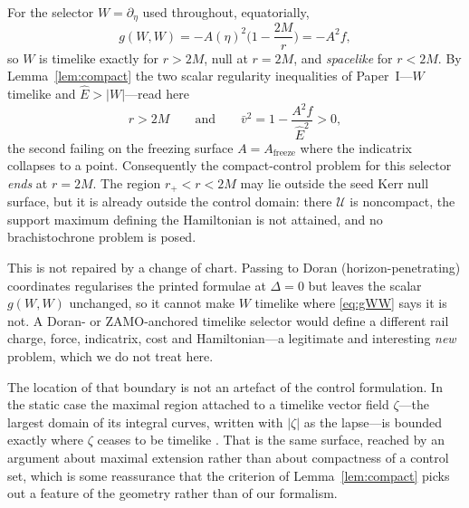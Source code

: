 \documentclass[12pt]{iopart}
\theoremstyle{plain}
\theoremstyle{definition}
\theoremstyle{remark}
\newcommand{\Ehat}{\hat E}
\newcommand{\rp}{r_{+}}
\newcommand{\Af}{A_{\mathrm{freeze}}}
\begin{document}
For the selector $W=\partial_\eta$ used throughout, equatorially,
\begin{equation}
    g(W,W)=-A(\eta)^2\Big(1-\frac{2M}{r}\Big)=-A^2f ,
    \label{eq:gWW}
\end{equation}
so $W$ is timelike exactly for $r>2M$, null at $r=2M$, and \emph{spacelike} for
$r<2M$. By Lemma~\ref{lem:compact} the two scalar regularity inequalities of
Paper~I---$W$ timelike and $\Ehat>|W|$---read here
\begin{equation}
    r>2M
    \qquad\text{and}\qquad
    \bar v^2=1-\frac{A^2f}{\Ehat^2}>0 ,
    \label{eq:two-inequalities}
\end{equation}
the second failing on the freezing surface $A=\Af$ where the indicatrix collapses
to a point. Consequently the compact-control problem for this selector
\emph{ends} at $r=2M$. The region $\rp<r<2M$ may lie outside the seed Kerr null
surface, but it is already outside the control domain: there $\mathcal U$ is
noncompact, the support maximum defining the Hamiltonian is not attained, and no
brachistochrone problem is posed.

This is not repaired by a change of chart. Passing to Doran
(horizon-penetrating) coordinates regularises the printed formulae at $\Delta=0$
but leaves the scalar $g(W,W)$ unchanged, so it cannot make $W$ timelike where
\eqref{eq:gWW} says it is not. A Doran- or ZAMO-anchored timelike selector would
define a different rail charge, force, indicatrix, cost and Hamiltonian---a
legitimate and interesting \emph{new} problem, which we do not treat here.

The location of that boundary is not an artefact of the control formulation. In
the static case the maximal region attached to a timelike vector field
$\zeta$---the largest domain of its integral curves, written with $|\zeta|$ as
the lapse---is bounded exactly where $\zeta$ ceases to be timelike
\cite{Lecian2025Cauchy}. That is the same surface, reached by an argument about
maximal extension rather than about compactness of a control set, which is some
reassurance that the criterion of Lemma~\ref{lem:compact} picks out a feature of
the geometry rather than of our formalism.
\end{document}
